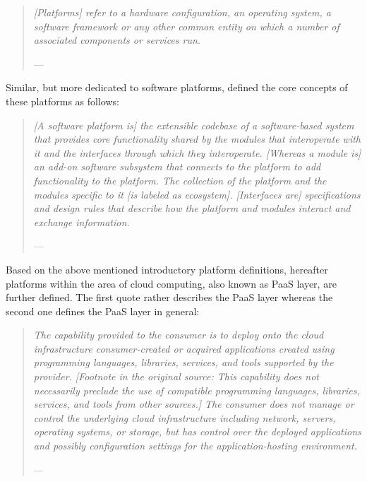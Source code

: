 \begin{quotation}{\slshape 
[Platforms] refer to a hardware configuration, an operating system, a software framework or any other common entity on which a number of associated components or services run.}
\vspace*{-7pt}
\begin{flushright}
	--- \citealp[p. 88]{Poel2007}
\end{flushright}
\end{quotation}

Similar, but more dedicated to software platforms, \citet{Tiwana2010} defined the core concepts of these platforms as follows:

\begin{quotation}{\slshape 
[A software platform is] the extensible codebase of a software-based system that provides core functionality shared by the modules that interoperate with it and the interfaces through which they interoperate. [Whereas a module is] an add-on software subsystem that connects to the platform to add functionality to the platform. The collection of the platform and the modules specific to it [is labeled as ecosystem]. [Interfaces are] specifications and design rules that describe how the platform and modules interact and exchange information.}
\vspace*{-7pt}
\begin{flushright}
	--- \citealp[p. 676]{Tiwana2010}
\end{flushright}
\end{quotation}

Based on the above mentioned introductory platform definitions, hereafter platforms within the area of cloud computing, also known as \ac{PaaS} layer, are further defined. The first quote rather describes the \ac{PaaS} layer whereas the second one defines the \ac{PaaS} layer in general:

\begin{quotation}{\slshape 
The capability provided to the consumer is to deploy onto the cloud infrastructure consumer-created or acquired applications created using programming languages, libraries, services, and tools supported by the provider. [Footnote in the original source: This capability does not necessarily preclude the use of compatible programming languages, libraries, services, and tools from other sources.] The consumer does not manage or control the underlying cloud infrastructure including network, servers, operating systems, or storage, but has control over the deployed applications and possibly configuration settings for the application-hosting environment.}
\vspace*{-7pt}
\begin{flushright}
	--- \citealp[pp. 2-3]{Mell2011}
\end{flushright}
\end{quotation}

